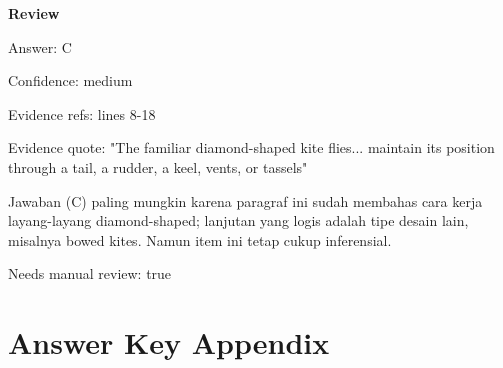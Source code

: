 \documentclass[12pt]{article}
\begin{document}
\begingroup
\setlength{\parskip}{0pt}
\setlength{\parindent}{0pt}
\textbf{Review}\par
Answer: C\par
Confidence: medium\par
Evidence refs: lines 8-18\par
Evidence quote: "The familiar diamond-shaped kite flies... maintain its position through a tail, a rudder, a keel, vents, or tassels"\par
Jawaban (C) paling mungkin karena paragraf ini sudah membahas cara kerja layang-layang diamond-shaped; lanjutan yang logis adalah tipe desain lain, misalnya bowed kites. Namun item ini tetap cukup inferensial.\par
Needs manual review: true\par
\endgroup
\par
\vspace{0.25\baselineskip}
\newpage
\section*{Answer Key Appendix}
\end{document}
